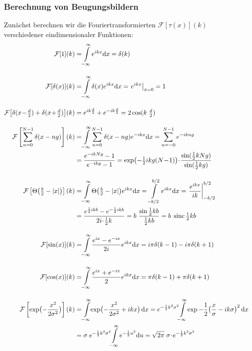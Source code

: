 \subsubsection{Berechnung von Beugungsbildern}
\enlargethispage{2em}
Zunächst berechnen wir die Fouriertransformierten $\mathcal{F}[\tau(x)](k)$ verschiedener eindimensionaler Funktionen:
\begin{align}
\mathcal{F}[1](k)
&= \Fint e^{ikx} \d x = \delta(k)
\\[1em]
\mathcal{F}[\delta(x)](k)
&= \Fint \delta(x) e^{ikx} \d x
  = \left. e^{ikx} \right|_{x=0} =  1
\\[1em]
\mathcal{F}\bigl[\delta(x\!-\!\tfrac{d}{2}) + \delta(x\!+\!\tfrac{d}{2})\bigr](k)
&%
  = e^{ik \frac d2} + e^{-ik \frac d2} = 2 \cos(k \; \tfrac d2)
\label{eq:doppel}		\\[1em]
\mathcal{F}\left[\sum\limits_{n=0}^{N-1} \delta(x-ng) \right](k)
&= \Fint \sum\limits_{n=0}^{N-1} \delta(x-ng) e^{-ikx}\d x
  =\sum\limits_{n=-0}^{N-1} e^{-ikng}												\nonumber\\
&= \frac{e^{-ikNg}-1}{e^{-ikg}-1}
  = \exp \bigl(-\tfrac12 ikg(N\!-\!1) \bigr) \cdt \frac{\sin(\tfrac12 kNg)}{\sin(\tfrac12 kg)}			%
\label{eq:kamm}		\\[1em]
\mathcal{F}\left[\Theta\bigl(\tfrac{b}{2}-|x|\bigr) \right](k)
&= \Fint \Theta\bigl(\tfrac{b}{2}-|x|\bigr) e^{ikx} \d x
  = \int\limits_{-b/2}^{b/2} e^{ikx} \d x = \left. \frac{e^{ikx}}{ik} \right|_{-b/2}^{b/2}					\nonumber\\
&= \frac{e^{\frac12 ikb} - e^{-\frac12 ikb}}{2i \cdt \tfrac12 k}
  = b ~ \frac{\sin \tfrac12 kb}{\tfrac12 kb}
  = b \; \sinc \tfrac12 kb
\label{eq:rechteck}	\\[1em]
\mathcal{F}[\sin(x)](k)
&= \Fint \frac{e^{ix}-e^{-ix}}{2i} e^{ikx} \d x
  = i \pi \delta(k-1) - i \pi \delta(k+1)
\\[1em]
\mathcal{F}[\cos(x)](k)
&= \Fint \frac{e^{ix}+e^{-ix}}{2} e^{ikx} \d x
  = \pi \delta(k-1) + \pi \delta(k+1)
\\[1em]
\mathcal{F}\left[\exp\bigl(-\frac{x^2}{2 \sigma^2}\bigr)\right](k)
&= \Fint\! \exp\bigl(-\frac{x^2}{2 \sigma^2} + ikx\bigr) \,\d x
  = e^{-\frac12 k^2\sigma^2} \!\Fint \exp{-\frac12 \bigl( \frac{x}{\sigma} - ik\sigma \bigr)^2} \,\d x		\nonumber\\
&= \sigma \; e^{-\frac12 k^2\sigma^2} \!\Fint e^{-\frac12 u^2} \d u
  = \sqrt{2\pi} \; \sigma \cdt e^{-\frac12 k^2\sigma^2}
\end{align}


